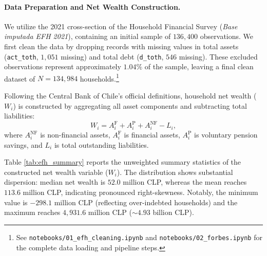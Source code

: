 \paragraph{Data Preparation and Net Wealth Construction.} 
We utilize the 2021 cross-section of the Household Financial Survey (\textit{Base imputada EFH 2021}), containing an initial sample of $136{,}400$ observations. We first clean the data by dropping records with missing values in total assets (\texttt{act\_toth}, $1{,}051$ missing) and total debt (\texttt{d\_toth}, $546$ missing). These excluded observations represent approximately $1.04\%$ of the sample, leaving a final clean dataset of $N = 134{,}984$ households.\footnote{See \texttt{notebooks/01\_efh\_cleaning.ipynb} and \texttt{notebooks/02\_forbes.ipynb} for the complete data loading and pipeline steps.}

Following the Central Bank of Chile's official definitions, household net wealth ($W_i$) is constructed by aggregating all asset components and subtracting total liabilities:
\begin{equation}
    W_i = A_i^{\text{F}} + A_i^{\text{P}} + A_i^{\text{NF}} - L_i,
    \label{eq:net_wealth_efh}
\end{equation}
where $A_i^{\text{NF}}$ is non-financial assets, $A_i^{\text{F}}$ is financial assets, $A_i^{\text{P}}$ is voluntary pension savings, and $L_i$ is total outstanding liabilities.

Table \ref{tab:efh_summary} reports the unweighted summary statistics of the constructed net wealth variable ($W_i$). The distribution shows substantial dispersion: median net wealth is $52.0$ million CLP, whereas the mean reaches $113.6$ million CLP, indicating pronounced right-skewness. Notably, the minimum value is $-298.1$ million CLP (reflecting over-indebted households) and the maximum reaches $4{,}931.6$ million CLP ($\sim 4.93$ billion CLP).


